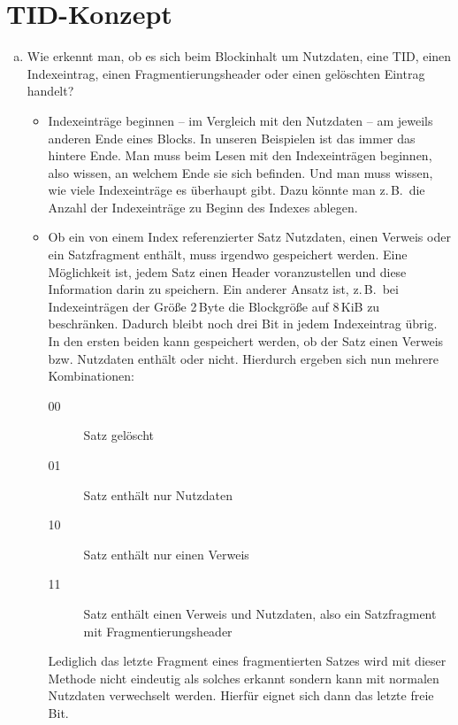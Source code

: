 \beamertxt{\pagebreak}
\section{TID-Konzept}
\begin{enumerate}[a)]
	\item Wie erkennt man, ob es sich beim Blockinhalt um Nutzdaten, eine TID, einen Indexeintrag, einen Fragmentierungsheader oder einen gelöschten Eintrag handelt?

	\begin{solution}
	\begin{itemize}
		\item Indexeinträge beginnen -- im Vergleich mit den Nutzdaten -- am jeweils anderen Ende eines Blocks.
		In unseren Beispielen ist das immer das hintere Ende.
		Man muss beim Lesen mit den Indexeinträgen beginnen, also wissen, an welchem Ende sie sich befinden.
		Und man muss wissen, wie viele Indexeinträge es überhaupt gibt.
		Dazu könnte man z.\,B.\ die Anzahl der Indexeinträge zu Beginn des Indexes ablegen.

		\item Ob ein von einem Index referenzierter Satz Nutzdaten, einen Verweis oder ein Satzfragment enthält, muss irgendwo gespeichert werden.
		Eine Möglichkeit ist, jedem Satz einen Header voranzustellen und diese Information darin zu speichern.
		Ein anderer Ansatz ist, z.\,B.\ bei Indexeinträgen der Größe 2\,Byte die Blockgröße auf 8\,KiB zu beschränken.
		Dadurch bleibt noch drei Bit in jedem Indexeintrag übrig.
		In den ersten beiden kann gespeichert werden, ob der Satz einen Verweis bzw. Nutzdaten enthält oder nicht.
		Hierdurch ergeben sich nun mehrere Kombinationen:
		\begin{description}
			\item[00] Satz gelöscht
			\item[01] Satz enthält nur Nutzdaten
			\item[10] Satz enthält nur einen Verweis
			\item[11] Satz enthält einen Verweis und Nutzdaten, also ein Satzfragment mit Fragmentierungsheader
		\end{description}
		Lediglich das letzte Fragment eines fragmentierten Satzes wird mit dieser Methode nicht eindeutig als solches erkannt sondern kann mit normalen Nutzdaten verwechselt werden.
		Hierfür eignet sich dann das letzte freie Bit.
	\end{itemize}
	\end{solution}


\end{enumerate}
